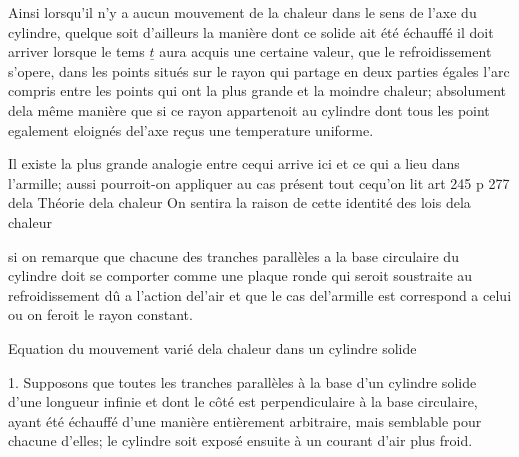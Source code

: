\documentclass[11pt,a4paper]{article}
\begin{document}
Ainsi lorsqu'il n'y a aucun mouvement de la chaleur
dans le sens de l'axe du cylindre, quelque soit d'ailleurs
la manière dont ce solide ait été échauffé il doit arriver
lorsque le tems $\underline{t}$ aura acquis une certaine valeur,
que le refroidissement s'opere, dans les points situés
sur le rayon qui partage en deux parties égales l'arc
compris entre les points qui ont la plus grande et la
moindre chaleur; absolument dela même manière que si
ce rayon appartenoit au cylindre dont tous les point
egalement eloignés del'axe   reçus une temperature
uniforme.

Il existe la plus grande analogie entre cequi arrive ici et ce
qui a lieu dans l'armille; aussi pourroit-on appliquer au
cas présent tout cequ'on lit art 245 p 277 dela Théorie dela chaleur
On sentira la raison de cette identité des lois dela chaleur


si on remarque que chacune des tranches parallèles a la base
circulaire du cylindre doit se comporter comme une plaque
ronde qui seroit soustraite au refroidissement dû a l'action
del'air et que le cas del'armille est correspond
a celui ou on feroit le rayon constant.


Equation du mouvement varié dela chaleur dans un cylindre
solide

1. Supposons que toutes les tranches parallèles à la base d'un
cylindre solide d'une longueur infinie et dont le côté est
perpendiculaire à la base circulaire, ayant été échauffé d'une
manière entièrement arbitraire, mais semblable pour chacune
d'elles; le cylindre soit exposé ensuite à un courant d'air
plus froid.
\end{document}
